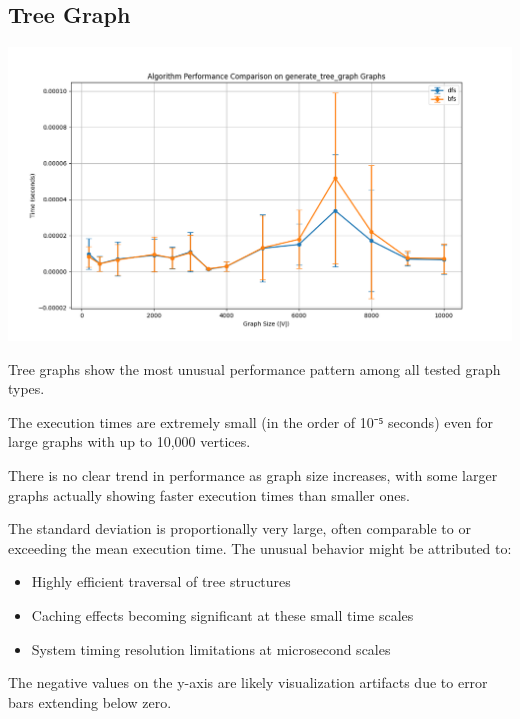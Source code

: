 \documentclass[a4paper,12pt]{article}
\begin{document}
\subsection{Tree Graph}
\label{sec:orgded6b34}
\begin{center}
\includegraphics[width=.9\linewidth]{dfs_tree.png}
\label{org5c77c7b}
\end{center}

Tree graphs show the most unusual performance pattern among all tested graph types.

The execution times are extremely small (in the order of 10⁻⁵ seconds) even for large graphs with up to 10,000 vertices.

There is no clear trend in performance as graph size increases, with some larger graphs actually showing faster execution times than smaller ones.

The standard deviation is proportionally very large, often comparable to or exceeding the mean execution time.
The unusual behavior might be attributed to:
\begin{itemize}
\item Highly efficient traversal of tree structures
\item Caching effects becoming significant at these small time scales
\item System timing resolution limitations at microsecond scales
\end{itemize}

The negative values on the y-axis are likely visualization artifacts due to error bars extending below zero.
\end{document}
